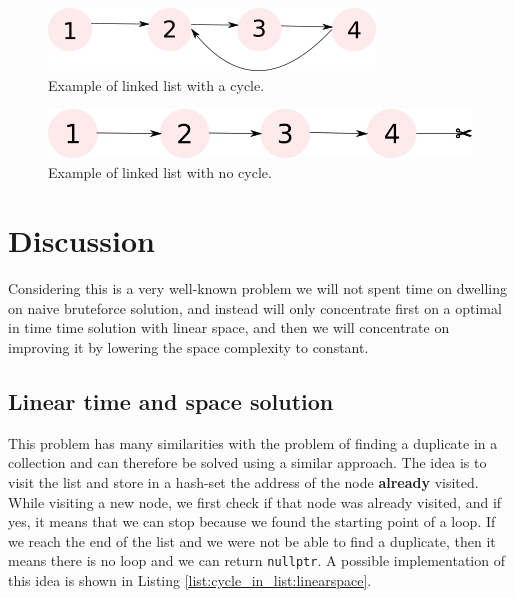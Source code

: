 \begin{figure}
	\label{fig:cycle_in_list:example1}
	\centering
	\includegraphics[scale=1.0]{sources/cycle_in_list/images/example1}
	\caption{Example of linked list with a cycle.}
\end{figure}
\begin{figure}
	\label{fig:cycle_in_list:example2}
	\centering
	\includegraphics[scale=1.0]{sources/cycle_in_list/images/example2}
	\caption{Example of linked list with no cycle.}
\end{figure}

%
%	

\section{Discussion}
\label{cycle_in_list:sec:discussion}
Considering this is a very well-known problem we will not spent time on dwelling on naive bruteforce solution, and instead will only concentrate first on a optimal in time time solution with linear space, and then we will concentrate on improving it by lowering the space complexity to constant.

\subsection{Linear time and space solution}
\label{cycle_in_list:sec:bruteforce}
This problem has many similarities with the problem of finding a duplicate in a collection and can therefore be solved using a similar approach. The idea is to visit the list and store in a hash-set the  address of the node \textbf{already} visited. While visiting a new node, we first check if that node was already visited, and if yes, it means that we can stop because we found the starting point of a loop. If we reach the end of the list and we were not be able to find a duplicate, then it means there is no loop and we can return \lstinline[columns=fixed]{nullptr}.
A possible implementation of this idea is shown in Listing \ref{list:cycle_in_list:linearspace}.

